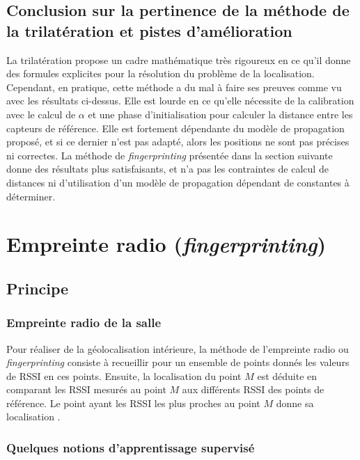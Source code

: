 \documentclass[french, a4paper, 12pt, parskip]{scrartcl}
\begin{document}
\subsection{Conclusion sur la pertinence de la méthode de la trilatération et pistes d'amélioration}

La trilatération propose un cadre mathématique très rigoureux en ce qu'il donne
des formules explicites pour la résolution du problème de la localisation.
Cependant, en pratique, cette méthode a du mal à faire ses preuves comme vu
avec les résultats ci-dessus. Elle est lourde en ce qu'elle nécessite de la
calibration avec le calcul de $\alpha$ et une phase d'initialisation pour
calculer la distance entre les capteurs de référence. Elle est fortement
dépendante du modèle de propagation proposé, et si ce dernier n'est pas adapté,
alors les positions ne sont pas précises ni correctes. La méthode de
\textit{fingerprinting} présentée dans la section suivante donne des résultats
plus satisfaisants, et n'a pas les contraintes de calcul de distances ni
d'utilisation d'un modèle de propagation dépendant de constantes à déterminer.

\section{Empreinte radio (\textit{fingerprinting})}

\subsection{Principe}

\subsubsection{Empreinte radio de la salle}

Pour réaliser de la géolocalisation intérieure, la méthode de l'empreinte radio
ou \textit{fingerprinting} consiste à recueillir pour un ensemble de points
donnés les valeurs de RSSI en ces points. Ensuite, la localisation du point $M$
est déduite en comparant les RSSI mesurés au point $M$ aux différents RSSI des
points de référence. Le point ayant les RSSI les plus proches au point $M$ donne
sa localisation \cite{FP}.

\subsubsection{Quelques notions d'apprentissage supervisé}
\end{document}

